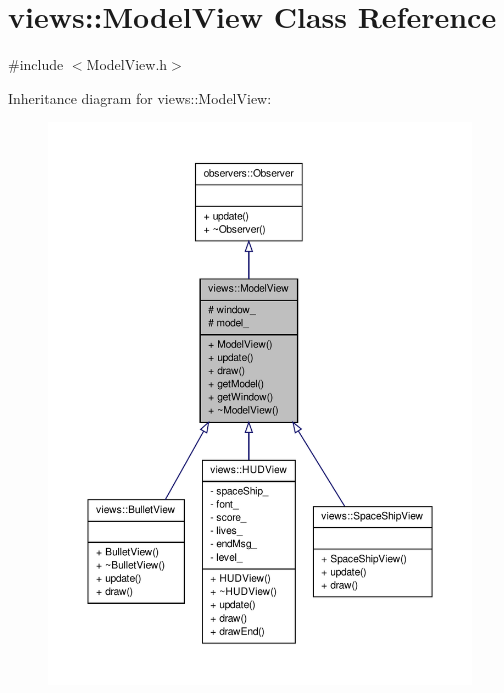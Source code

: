 \hypertarget{classviews_1_1ModelView}{\section{views\-:\-:\-Model\-View \-Class \-Reference}
\label{d8/d67/classviews_1_1ModelView}
}


{\ttfamily \#include $<$\-Model\-View.\-h$>$}



\-Inheritance diagram for views\-:\-:\-Model\-View\-:
\nopagebreak
\begin{figure}[H]
\begin{center}
\leavevmode
\includegraphics[width=350pt]{dd/dda/classviews_1_1ModelView__inherit__graph}
\end{center}
\end{figure}


